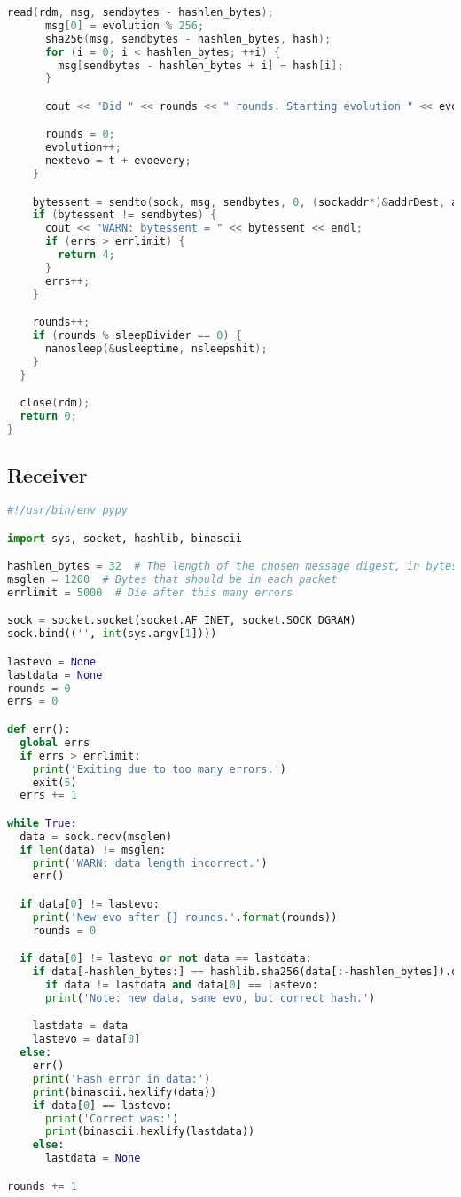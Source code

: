 \begin{appendices}
\begin{lstlisting}[language=C++]
      read(rdm, msg, sendbytes - hashlen_bytes);
      msg[0] = evolution % 256;
      sha256(msg, sendbytes - hashlen_bytes, hash);
      for (i = 0; i < hashlen_bytes; ++i) {
        msg[sendbytes - hashlen_bytes + i] = hash[i];
      }

      cout << "Did " << rounds << " rounds. Starting evolution " << evolution << endl;

      rounds = 0;
      evolution++;
      nextevo = t + evoevery;
    }

    bytessent = sendto(sock, msg, sendbytes, 0, (sockaddr*)&addrDest, ads);
    if (bytessent != sendbytes) {
      cout << "WARN: bytessent = " << bytessent << endl;
      if (errs > errlimit) {
        return 4;
      }
      errs++;
    }

    rounds++;
    if (rounds % sleepDivider == 0) {
      nanosleep(&usleeptime, nsleepshit);
    }
  }

  close(rdm);
  return 0;
}
\end{lstlisting}

\subsection{Receiver}
\begin{lstlisting}[language=Python]
#!/usr/bin/env pypy

import sys, socket, hashlib, binascii

hashlen_bytes = 32  # The length of the chosen message digest, in bytes
msglen = 1200  # Bytes that should be in each packet
errlimit = 5000  # Die after this many errors

sock = socket.socket(socket.AF_INET, socket.SOCK_DGRAM)
sock.bind(('', int(sys.argv[1])))

lastevo = None
lastdata = None
rounds = 0
errs = 0

def err():
  global errs
  if errs > errlimit:
    print('Exiting due to too many errors.')
    exit(5)
  errs += 1

while True:
  data = sock.recv(msglen)
  if len(data) != msglen:
    print('WARN: data length incorrect.')
    err()

  if data[0] != lastevo:
    print('New evo after {} rounds.'.format(rounds))
    rounds = 0

  if data[0] != lastevo or not data == lastdata:
    if data[-hashlen_bytes:] == hashlib.sha256(data[:-hashlen_bytes]).digest():
      if data != lastdata and data[0] == lastevo:
      print('Note: new data, same evo, but correct hash.')

    lastdata = data
    lastevo = data[0]
  else:
    err()
    print('Hash error in data:')
    print(binascii.hexlify(data))
    if data[0] == lastevo:
      print('Correct was:')
      print(binascii.hexlify(lastdata))
    else:
      lastdata = None

rounds += 1
\end{lstlisting}

\end{appendices}
